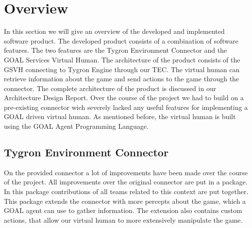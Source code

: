 \section{Overview}
In this section we will give an overview of the developed and implemented software product. The developed product consists of a combination of software features. The two features are the Tygron Environment Connector and the GOAL Services Virtual Human. The architecture of the product consists of the GSVH connecting to Tygron Engine through our TEC. The virtual human can retrieve information about the game and send actions to the game through the connector. The complete architecture of the product is discussed in our Architecture Design Report\cite{CTD16}. Over the course of the project we had to build on a pre-existing connector wich severely lacked any useful features for implementing a GOAL driven virtual human. As mentioned before, the virtual human is built using the GOAL Agent Programming Language\cite{GOAL16}. 

\subsection{Tygron Environment Connector}
On the provided connector a lot of improvements have been made over the course of the project. All improvements over the original connector are put in a package. In this package contributions of all teams related to this context are put together. This package extends the connector with more percepts about the game, which a GOAL agent can use to gather information. The extension also contains custom actions, that allow our virtual human to more extensively manipulate the game. 

\subsection{}

\newpage